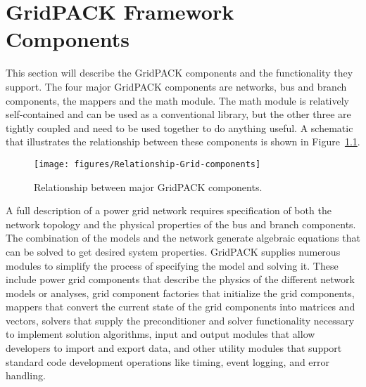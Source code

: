 \chapter{GridPACK Framework Components}

This section will describe the GridPACK components and the functionality they
support. The four major GridPACK components are networks, bus and branch
components, the mappers and the math module. The math module is relatively
self-contained and can be used as a conventional library, but the other three
are tightly coupled and need to be used together to do anything useful. A
schematic that illustrates the relationship between these components is shown in
Figure~\ref{fig:relationship}.

\begin{figure}
  \centering
    \texttt{[image: figures/Relationship-Grid-components]}
  \caption{Relationship between major GridPACK components.}
  \label{fig:relationship}
\end{figure}




A full description of a power grid network requires specification of both the
network topology and the physical properties of the bus and branch components.
The combination of the models and the network generate algebraic equations that
can be solved to get desired system properties. GridPACK supplies numerous
modules to simplify the process of specifying the model and solving it. These
include power grid components that describe the physics of the different network
models or analyses, grid component factories that initialize the grid
components, mappers that convert the current state of the grid components into
matrices and vectors, solvers that supply the preconditioner and solver
functionality necessary to implement solution algorithms, input and output
modules that allow developers to import and export data, and other utility
modules that support standard code development operations like timing, event logging, and error handling.

